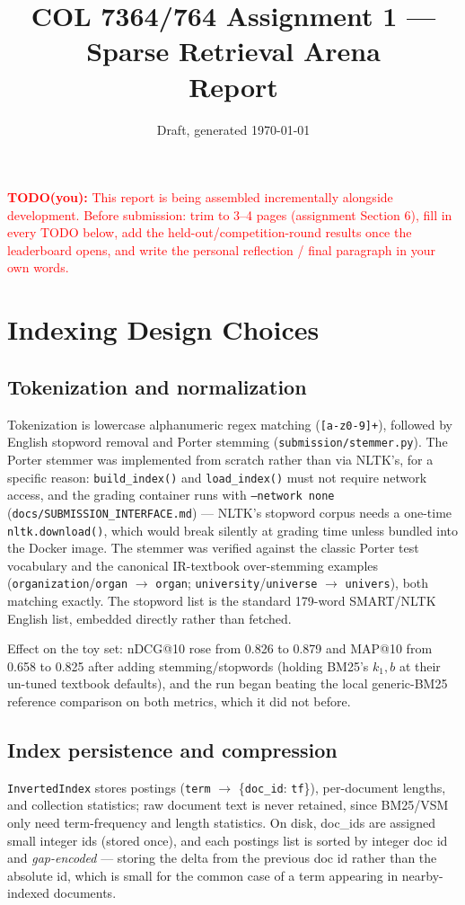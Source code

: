 \documentclass[11pt]{article}
\title{COL 7364/764 Assignment 1 --- Sparse Retrieval Arena \\ \large Report}
\author{\todo{name and registration number}}
\date{Draft, generated \today}
\newcommand{\todo}[1]{\textcolor{red}{\textbf{TODO(you):} #1}}
\begin{document}
\maketitle

\todo{This report is being assembled incrementally alongside development.
Before submission: trim to 3--4 pages (assignment Section 6), fill in
every TODO below, add the held-out/competition-round results once the
leaderboard opens, and write the personal reflection / final paragraph
in your own words.}

\section{Indexing Design Choices}

\subsection{Tokenization and normalization}
Tokenization is lowercase alphanumeric regex matching (\texttt{[a-z0-9]+}),
followed by English stopword removal and Porter stemming
(\texttt{submission/stemmer.py}). The Porter stemmer was implemented from
scratch rather than via NLTK's, for a specific reason: \texttt{build\_index()}
and \texttt{load\_index()} must not require network access, and the
grading container runs with \texttt{--network none}
(\texttt{docs/SUBMISSION\_INTERFACE.md}) --- NLTK's stopword corpus needs a
one-time \texttt{nltk.download()}, which would break silently at grading
time unless bundled into the Docker image. The stemmer was verified
against the classic Porter test vocabulary and the canonical IR-textbook
over-stemming examples (\texttt{organization}/\texttt{organ}
$\to$ \texttt{organ}; \texttt{university}/\texttt{universe} $\to$
\texttt{univers}), both matching exactly. The stopword list is the
standard 179-word SMART/NLTK English list, embedded directly rather than
fetched.

Effect on the toy set: nDCG@10 rose from 0.826 to 0.879 and MAP@10 from
0.658 to 0.825 after adding stemming/stopwords (holding BM25's $k_1,b$ at
their un-tuned textbook defaults), and the run began beating the local
generic-BM25 reference comparison on both metrics, which it did not
before.

\subsection{Index persistence and compression}
\texttt{InvertedIndex} stores postings (\texttt{term} $\to$
\{\texttt{doc\_id}: \texttt{tf}\}), per-document lengths, and collection
statistics; raw document text is never retained, since BM25/VSM only need
term-frequency and length statistics. On disk, doc\_ids are assigned
small integer ids (stored once), and each postings list is sorted by
integer doc id and \emph{gap-encoded} --- storing the delta from the
previous doc id rather than the absolute id, which is small for the
common case of a term appearing in nearby-indexed documents.
\end{document}
